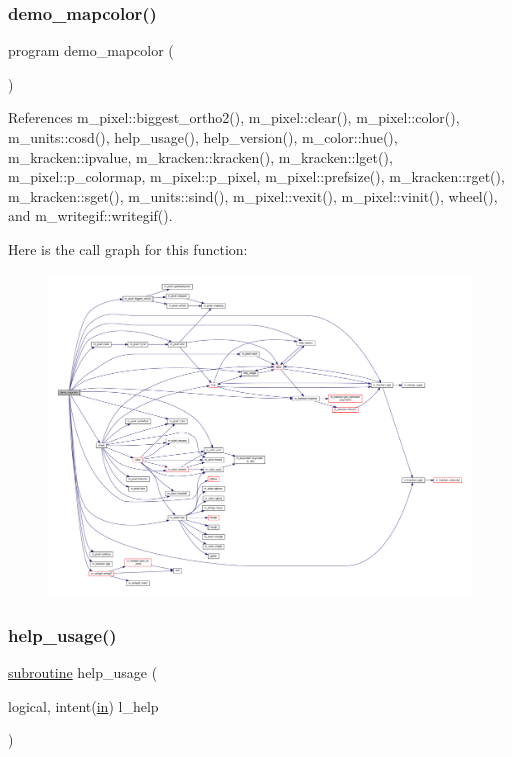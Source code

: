 \subsubsection{\texorpdfstring{demo\+\_\+mapcolor()}{demo\_mapcolor()}}
{\footnotesize\ttfamily program demo\+\_\+mapcolor (\begin{DoxyParamCaption}{ }\end{DoxyParamCaption})}



References m\+\_\+pixel\+::biggest\+\_\+ortho2(), m\+\_\+pixel\+::clear(), m\+\_\+pixel\+::color(), m\+\_\+units\+::cosd(), help\+\_\+usage(), help\+\_\+version(), m\+\_\+color\+::hue(), m\+\_\+kracken\+::ipvalue, m\+\_\+kracken\+::kracken(), m\+\_\+kracken\+::lget(), m\+\_\+pixel\+::p\+\_\+colormap, m\+\_\+pixel\+::p\+\_\+pixel, m\+\_\+pixel\+::prefsize(), m\+\_\+kracken\+::rget(), m\+\_\+kracken\+::sget(), m\+\_\+units\+::sind(), m\+\_\+pixel\+::vexit(), m\+\_\+pixel\+::vinit(), wheel(), and m\+\_\+writegif\+::writegif().

Here is the call graph for this function\+:
\nopagebreak
\begin{figure}[H]
\begin{center}
\leavevmode
\includegraphics[width=350pt]{huegif_8f90_a4cb33e3f49cb1fde8386c9e2b79874fe_cgraph}
\end{center}
\end{figure}
\mbox{\label{huegif_8f90_a3e09a3b52ee8fb04eeb93fe5761626a8}} 
\subsubsection{\texorpdfstring{help\+\_\+usage()}{help\_usage()}}
{\footnotesize\ttfamily \hyperlink{M__stopwatch_83_8txt_acfbcff50169d691ff02d4a123ed70482}{subroutine} help\+\_\+usage (\begin{DoxyParamCaption}\item[{logical, intent(\hyperlink{M__journal_83_8txt_afce72651d1eed785a2132bee863b2f38}{in})}]{l\+\_\+help }\end{DoxyParamCaption})}



